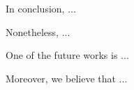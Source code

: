In conclusion, ...

Nonetheless, ...

One of the future works is ... 

Moreover, we believe that ...
